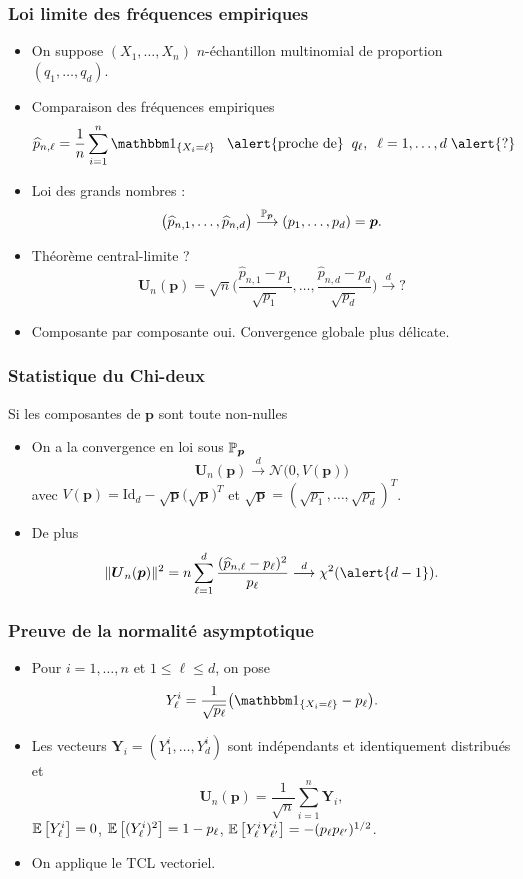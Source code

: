 \begin{frame}
\frametitle{Loi limite des fréquences empiriques}
\begin{itemize}
\item On suppose $(X_1,\dots,X_n)$ $n$-échantillon multinomial de proportion $(q_1,\dots,q_d)$.
\item \alert{Comparaison des fréquences empiriques}
$$\widehat p_{n,\ell}=\frac{1}{n}\sum_{i=1}^n \indi{X_i=\ell}\;\;\;\text{\alert{proche de}}\;\;q_\ell,\;\;\ell=1,\ldots, d\; \alert{?}$$
\item Loi des grands nombres :
$$\big(\widehat p_{n,1},\ldots, \widehat p_{n,d}\big) \stackrel{\operatorname{{\mathbb P}}_{{\boldsymbol p}}}{\longrightarrow} (p_1,\ldots, p_d)={\boldsymbol p}.$$
\item \alert{Théorème central-limite ?}
$${\boldsymbol{U}_n}(\boldsymbol{p})=\sqrt{n}\Big(\frac{\widehat p_{n,1}-p_1}{\sqrt{p_1}},\ldots, \frac{\widehat p_{n,d}-p_d}{\sqrt{p_d}}\Big) \stackrel{d}{\longrightarrow} ?$$
\item Composante par composante oui. \alert{Convergence globale plus délicate}.
\end{itemize}
\end{frame}

\begin{frame}
\frametitle{Statistique du Chi-deux}
\begin{prop}
Si les composantes de $\boldsymbol{p}$ sont toute non-nulles
\begin{itemize}
\item On a la \alert{convergence en loi} sous $\operatorname{{\mathbb P}}_{\boldsymbol{p}}$
$${\boldsymbol{U}_n}(\boldsymbol{p})\stackrel{d}{\longrightarrow} {\mathcal N}\big(0,V(\boldsymbol{p})\big)$$
avec $V(\boldsymbol{p}) = \mathrm{Id}_d-\sqrt{\boldsymbol{p}}\big(\sqrt{\boldsymbol{p}}\big)^T$ et $\sqrt{\boldsymbol{p}} = (\sqrt{p_1},\ldots, \sqrt{p_d})^T$.
\item \alert{De plus}
$$\|{\boldsymbol{U}_n}(\boldsymbol{p})\|^2 = n\sum_{\ell=1}^d \frac{(\widehat p_{n,\ell}-p_\ell)^2}{p_\ell} \stackrel{d}{\longrightarrow} \chi^2(\alert{d-1}).$$
\end{itemize}
\end{prop}
\end{frame}

\begin{frame}
\frametitle{Preuve de la normalité asymptotique}
\begin{itemize}
\item Pour $i=1,\ldots, n$ et $1 \leq \ell \leq d$, on pose
$$Y_\ell^i=\frac{1}{\sqrt{p_\ell}}\big(\indi{X_i=\ell}-p_\ell\big).$$
\item Les vecteurs ${\boldsymbol Y}_i=(Y_1^i,\ldots, Y_d^i)$ sont \alert{indépendants et identiquement distribués} et
$${\boldsymbol U}_n(\boldsymbol{p}) = \frac{1}{\sqrt{n}}\sum_{i = 1}^n {\boldsymbol Y}_i,$$
$\operatorname{{\mathbb E}}\big[Y_\ell^i\big]=0$, $\operatorname{{\mathbb E}}\big[(Y_\ell^i)^2\big]=1-p_\ell$, $\operatorname{{\mathbb E}}\big[Y_\ell^iY_{\ell'}^i \big]=-(p_\ell p_{\ell'})^{1/2}$.
\item \alert{On applique le TCL vectoriel}.
\end{itemize}
\end{frame}

